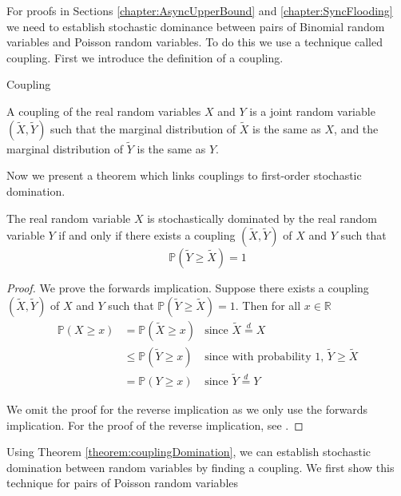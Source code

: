 For proofs in Sections \ref{chapter:AsyncUpperBound} and \ref{chapter:SyncFlooding} we need to establish stochastic dominance between pairs of Binomial random variables and Poisson random variables. To do this we use a technique called coupling. First we introduce the definition of a coupling.

\begin{definition} %
	Coupling

	\noindent
	A  coupling of the real random variables $X$ and $Y$ is a joint random variable $(\tilde{X}, \tilde{Y})$ such that the marginal distribution of $\tilde{X}$ is the same as $X$, and the marginal distribution of $\tilde{Y}$ is the same as $Y$.
\end{definition}


Now we present a theorem which links couplings to first-order stochastic domination.

\begin{theorem}\label{theorem:couplingDomination}
	The real random variable $X$ is stochastically dominated by the real random variable $Y$ if and only if there exists a coupling $(\tilde{X}, \tilde{Y})$ of $X$ and $Y$ such that
	$$
		\mathbb{P}(\tilde{Y} \geq \tilde{X}) = 1
	$$
\end{theorem}

\begin{proof}
	We prove the forwards implication. Suppose there exists a coupling $(\tilde{X}, \tilde{Y})$ of $X$ and $Y$ such that $\mathbb{P}(\tilde{Y} \geq \tilde{X}) = 1$. Then for all $x \in \mathbb{R}$
	\begin{align*}
		\mathbb{P}(X \geq x) &= \mathbb{P}(\tilde{X} \geq x) & \text{since } \tilde{X} \stackrel{d}{=} X \\
		&\leq \mathbb{P}(\tilde{Y} \geq x) & \text{since with probability 1, } \tilde{Y} \geq \tilde{X} \\
		&= \mathbb{P}(Y \geq x) & \text{since } \tilde{Y} \stackrel{d}{=} Y 
	\end{align*}

	We omit the proof for the reverse implication as we only use the forwards implication. For the proof of the reverse implication, see \cite{coupling}.
\end{proof}


Using Theorem \ref{theorem:couplingDomination}, we can establish stochastic domination between random variables by finding a coupling. We first show this technique	for pairs of Poisson random variables

